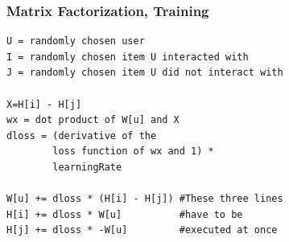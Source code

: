 \documentclass{beamer}
\newcommand\marktopleft[1]{%
    \tikz[overlay,remember picture] 
    \node (marker-#1-a) at (0,1.5ex) {};%
}
\newcommand\markbottomright[2][red]{%
    \tikz[overlay,remember picture] 
    \node (marker-#2-b) at (0,0) {};%
    \tikz[overlay,remember picture,thick,inner sep=3pt,fill=red]
    \node[draw,rectangle,fill=#1,nearly transparent,fit=(marker-#2-a.center) (marker-#2-b.center)] {};%
}
\begin{document}
\begin{frame}[fragile]
    \frametitle{Matrix Factorization, Training}
\begin{lstlisting}[style=pseudocode]
U = randomly chosen user
I = randomly chosen item U interacted with
J = randomly chosen item U did not interact with

X=H[i] - H[j]
wx = dot product of W[u] and X
dloss = (derivative of the 
        loss function of wx and 1) * 
        learningRate
        
W[u] += dloss * (H[i] - H[j]) #These three lines
H[i] += dloss * W[u]          #have to be
H[j] += dloss * -W[u]         #executed at once
\end{lstlisting}
\end{frame}
%
\end{document}
